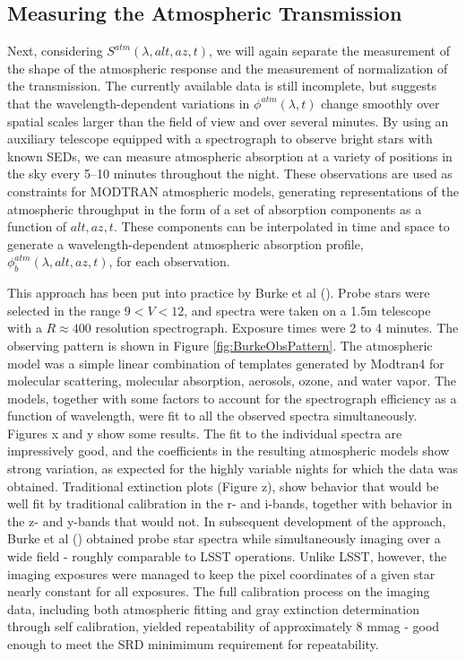 \documentclass[12pt,preprint]{aastex}
\begin{document}
\subsection{Measuring the Atmospheric Transmission}
Next, considering $S^{atm}(\lambda,alt,az,t)$, we will again separate
the measurement of the shape of the atmospheric response and the
measurement of normalization of the transmission.  The currently
available data is still incomplete, but suggests that the
wavelength-dependent variations in $\phi^{atm}(\lambda,t)$ change
smoothly over spatial scales larger than the field of view and over
several minutes.  By using an auxiliary telescope equipped with a
spectrograph to observe bright stars with known SEDs, we can measure
atmospheric absorption at a variety of positions in the sky every
5--10 minutes throughout the night. These observations are used as
constraints for MODTRAN atmospheric models, generating representations
of the atmospheric throughput in the form of a set of absorption
components as a function of $alt,az,t$. These components can be
interpolated in time and space to generate a wavelength-dependent
atmospheric absorption profile, $\phi_b^{atm}(\lambda,alt,az,t)$, for
each observation.

This approach has been put into practice by Burke et al (\citep{Burke2010b}).  Probe stars were selected in
the range $9 < V < 12$, and spectra were taken on a 1.5m telescope with a $R \approx 400$ resolution 
spectrograph.  Exposure times were 2 to 4 minutes.  The observing pattern is shown in Figure \ref{fig:BurkeObsPattern}.  
The atmospheric model was a simple linear combination of templates generated by Modtran4 for molecular scattering,
molecular absorption, aerosols, ozone, and water vapor.  The models, together with some factors to account for the
spectrograph efficiency as a function of wavelength, were fit to all the observed spectra simultaneously.   Figures x and y
show some results.   The fit to the individual spectra are impressively good, and the coefficients in the resulting 
atmospheric models show strong variation, as expected for the highly variable nights for which the data was obtained.  
Traditional extinction plots (Figure z), show behavior that would be well fit by traditional calibration in the r- 
and i-bands, together with behavior in the z- and y-bands that would not.  In subsequent development of the approach,
Burke et al (\citep{burke2013}) obtained probe star spectra while simultaneously imaging over a wide field - roughly 
comparable to LSST operations.  Unlike LSST, however, the imaging exposures were managed to keep the pixel coordinates
of a given star nearly constant for all exposures.  The full calibration process on the imaging data, 
including both atmospheric fitting and gray extinction determination through self calibration, yielded repeatability 
of approximately 8 mmag - good enough to meet the SRD minimimum requirement for repeatability.
\end{document}
